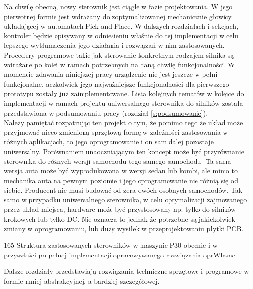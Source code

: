 Na chwilę obecną, nowy sterownik jest ciągle w fazie projektowania. W jego pierwotnej formie jest wdrażany do zoptymalizowanej mechanicznie głowicy układającej w automatach Pick and Place. W dalszych rozdziałach i sekcjach, kontroler będzie opisywany w odniesieniu właśnie do tej implementacji w celu lepszego wytłumaczenia jego działania i rozwiązań w nim zastosowanych. Procedury programowe takie jak sterowanie konkretnym rodzajem silnika są wdrażane po kolei w ramach potrzebnych na daną chwilę funkcjonalności. W momencie zdawania niniejszej pracy urządzenie nie jest jeszcze w pełni funkcjonalne, aczkolwiek jego najważniejsze funkcjonalności dla pierwszego prototypu zostały już zaimplementowane. Lista kolejnych tematów w kolejce do implementacji w ramach projektu uniwersalnego sterownika do silników została przedstawiona w podsumowaniu pracy (rozdział \ref{s:podsumowanie}). \\

Należy pamiętać rozpatrując ten projekt o tym, że pomimo tego że układ może przyjmować nieco zmienioną sprzętową formę w zależności zastosowania w różnych aplikacjach, to jego oprogramowanie i on sam dalej pozostaje uniwersalny. Porównaniem unaoczniającym ten koncept może być przyrównanie sterownika do różnych wersji samochodu tego samego samochodu- Ta sama wersja auta może być wyprodukowana w wersji sedan lub kombi, ale mimo to mechanika auta na pewnym poziomie i jego oprogramowanie nie różnią się od siebie. Producent nie musi budować od zera dwóch osobnych samochodów. Tak samo w przypadku uniwersalnego sterownika, w celu optymalizacji zajmowanego przez układ miejsca, hardware może być przystosowany np. tylko do silników krokowych lub tylko DC. Nie oznacza to jednak że potrzebne są jakiekolwiek zmiany w oprogramowaniu, lub duży wysiłek w przeprojektowaniu płytki PCB. 

	{165}
	{Struktura zastosowanych sterowników w maszynie P30 obecnie i w przyszłości po pełnej implementacji opracowywanego rozwiązania}
	{oprWlasne}

Dalsze rozdziały przedstawiają rozwiązania techniczne sprzętowe i programowe w formie mniej abstrakcyjnej, a bardziej szczegółowej.

\clearpage



